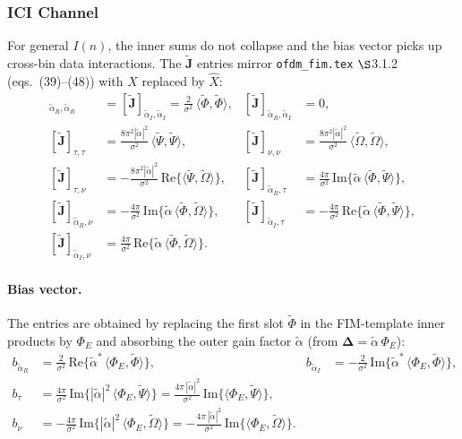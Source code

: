 \documentclass[11pt]{article}
\begin{document}
\subsubsection{ICI Channel}

For general \(I(n)\), the inner sums do not collapse and the bias vector picks up cross-bin data interactions. The \(\tilde{\bm{J}}\) entries mirror \texttt{ofdm\_fim.tex} \(\S\)3.1.2 (eqs.\ (39)--(48)) with \(X\) replaced by \(\hat{X}\):
\begin{align}
    [\tilde{\bm{J}}]_{\tilde{\alpha}_R, \tilde{\alpha}_R} &= [\tilde{\bm{J}}]_{\tilde{\alpha}_I, \tilde{\alpha}_I} = \tfrac{2}{\sigma^2}\, \langle \tilde{\Phi}, \tilde{\Phi}\rangle, &
    [\tilde{\bm{J}}]_{\tilde{\alpha}_R, \tilde{\alpha}_I} &= 0, \\
    [\tilde{\bm{J}}]_{\tau, \tau} &= \tfrac{8\pi^2 |\tilde{\alpha}|^2}{\sigma^2}\, \langle \tilde{\Psi}, \tilde{\Psi}\rangle, &
    [\tilde{\bm{J}}]_{\nu, \nu} &= \tfrac{8\pi^2 |\tilde{\alpha}|^2}{\sigma^2}\, \langle \tilde{\Omega}, \tilde{\Omega}\rangle, \\
    [\tilde{\bm{J}}]_{\tau, \nu} &= -\tfrac{8\pi^2 |\tilde{\alpha}|^2}{\sigma^2}\, \mathrm{Re}\{\langle \tilde{\Psi}, \tilde{\Omega}\rangle\}, &
    [\tilde{\bm{J}}]_{\tilde{\alpha}_R, \tau} &= \tfrac{4\pi}{\sigma^2}\, \mathrm{Im}\{\tilde{\alpha}\, \langle \tilde{\Phi}, \tilde{\Psi}\rangle\}, \\
    [\tilde{\bm{J}}]_{\tilde{\alpha}_R, \nu} &= -\tfrac{4\pi}{\sigma^2}\, \mathrm{Im}\{\tilde{\alpha}\, \langle \tilde{\Phi}, \tilde{\Omega}\rangle\}, &
    [\tilde{\bm{J}}]_{\tilde{\alpha}_I, \tau} &= -\tfrac{4\pi}{\sigma^2}\, \mathrm{Re}\{\tilde{\alpha}\, \langle \tilde{\Phi}, \tilde{\Psi}\rangle\}, \\
    [\tilde{\bm{J}}]_{\tilde{\alpha}_I, \nu} &= \tfrac{4\pi}{\sigma^2}\, \mathrm{Re}\{\tilde{\alpha}\, \langle \tilde{\Phi}, \tilde{\Omega}\rangle\}. & &
\end{align}

\paragraph{Bias vector.} The entries are obtained by replacing the first slot \(\tilde{\Phi}\) in the FIM-template inner products by \(\Phi_E\) and absorbing the outer gain factor \(\tilde{\alpha}\) (from \(\bm{\Delta} = \tilde{\alpha}\, \Phi_E\)):
\begin{align}
    b_{\tilde{\alpha}_R} &= \tfrac{2}{\sigma^2}\, \mathrm{Re}\{\tilde{\alpha}^*\, \langle \Phi_E, \tilde{\Phi}\rangle\}, &
    b_{\tilde{\alpha}_I} &= -\tfrac{2}{\sigma^2}\, \mathrm{Im}\{\tilde{\alpha}^*\, \langle \Phi_E, \tilde{\Phi}\rangle\}, \\
    b_\tau &= \tfrac{4\pi}{\sigma^2}\, \mathrm{Im}\{|\tilde{\alpha}|^2\, \langle \Phi_E, \tilde{\Psi}\rangle\} = \tfrac{4\pi\, |\tilde{\alpha}|^2}{\sigma^2}\, \mathrm{Im}\{\langle \Phi_E, \tilde{\Psi}\rangle\}, \\
    b_\nu &= -\tfrac{4\pi}{\sigma^2}\, \mathrm{Im}\{|\tilde{\alpha}|^2\, \langle \Phi_E, \tilde{\Omega}\rangle\} = -\tfrac{4\pi\, |\tilde{\alpha}|^2}{\sigma^2}\, \mathrm{Im}\{\langle \Phi_E, \tilde{\Omega}\rangle\}.
\end{align}
\end{document}
